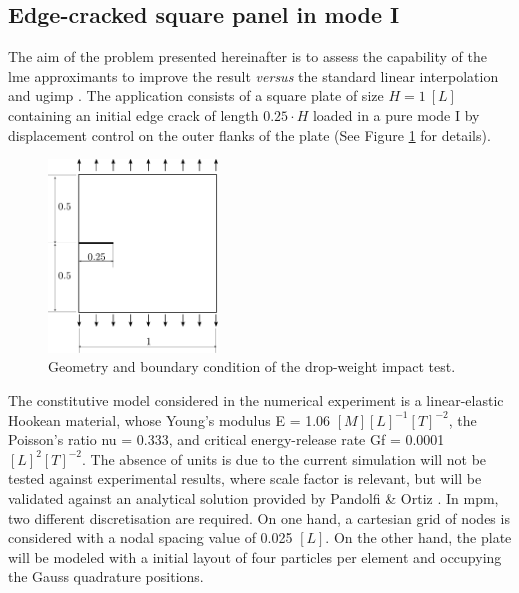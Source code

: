 \documentclass[preprint,12pt,a4paper]{elsarticle}
\begin{document}
\subsection{Edge-cracked square panel in mode I}
\label{sec:3.1}
The aim of the problem presented hereinafter is to assess the
capability of the \acrshort{lme} approximants to improve the result
\textit{versus} the standard linear interpolation and \acrshort{ugimp}
\cite{Bardenhagen2004}. The application
consists of a square plate of size $H = 1\ [L] $ containing an initial edge
crack of length $0.25 \cdot H$ loaded in a pure mode I by displacement
control on the outer flanks of the plate (See Figure
\ref{fig:geometry-cracked-panel-mode-I} for details). 
\begin{figure}
  \centering
  \includegraphics[width=0.4\textwidth]{Figure-Mode_I}
  \caption{Geometry and boundary condition of the drop-weight impact test.}
  \label{fig:geometry-cracked-panel-mode-I}
\end{figure}
The constitutive model considered in the numerical experiment is a
linear-elastic Hookean material, whose Young's modulus \gls{E} = 1.06
$[M] [L]^{-1} [T]^{-2}$, the Poisson's ratio \gls{nu} = 0.333, and
critical energy-release rate \gls{Gf} = 0.0001 $[L]^{2} [T]^{-2}$. The absence of units is due to the current
simulation will not be tested against experimental results, where
scale factor is relevant, but will be validated against an analytical
solution provided by Pandolfi \& Ortiz \cite{Pandolfi_2012}. In
\acrshort{mpm}, two different discretisation are required. On one
hand, a cartesian grid of nodes is considered with a nodal spacing
value of 0.025 $[L]$. On the other hand, the plate will be modeled with a
initial layout of four particles per element and occupying the Gauss
quadrature positions.\\
\end{document}
